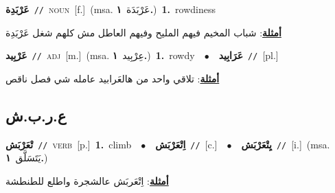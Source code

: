 \documentclass[10pt,a4paper,twoside]{article} %
\begin{document}
\begin{multicols}{2}
{\setlength\topsep{0pt}\textbf{\foreignlanguage{arabic}{عَرْبَدِة}}\ {\color{gray}\texttt{//}\color{black}}\ \textsc{noun}\ [f.]\ \color{gray}(msa. \foreignlanguage{arabic}{عَرْبَدَة}~\foreignlanguage{arabic}{\textbf{١.}})\color{black}\ \textbf{1.}~rowdiness\  \begin{flushright}\color{gray}\foreignlanguage{arabic}{\textbf{\underline{\foreignlanguage{arabic}{أمثلة}}}: شباب المخيم فيهم المليح وفيهم العاطل مش كلهم شغل عَرْبَدِة}\end{flushright}\color{black}} \vspace{2mm}

{\setlength\topsep{0pt}\textbf{\foreignlanguage{arabic}{عَرْبِيد}}\ {\color{gray}\texttt{//}\color{black}}\ \textsc{adj}\ [m.]\ \color{gray}(msa. \foreignlanguage{arabic}{عِرْبِيد}~\foreignlanguage{arabic}{\textbf{١.}})\color{black}\ \textbf{1.}~rowdy\ \ $\bullet$\ \ \setlength\topsep{0pt}\textbf{\foreignlanguage{arabic}{عَرَابِيد}}\ {\color{gray}\texttt{//}\color{black}}\ [pl.]\  \begin{flushright}\color{gray}\foreignlanguage{arabic}{\textbf{\underline{\foreignlanguage{arabic}{أمثلة}}}: تلاقي واحد من هالعَرابيد عامله شي فصل ناقص}\end{flushright}\color{black}} \vspace{2mm}

\vspace{-3mm}
\subsection*{\color{blue}\foreignlanguage{arabic}{ع.ر.ب.ش}\color{blue}{}} 

{\setlength\topsep{0pt}\textbf{\foreignlanguage{arabic}{تْعَرْبَش}}\ {\color{gray}\texttt{//}\color{black}}\ \textsc{verb}\ [p.]\ \textbf{1.}~climb\ \ $\bullet$\ \ \setlength\topsep{0pt}\textbf{\foreignlanguage{arabic}{اِتْعَرْبَش}}\ {\color{gray}\texttt{//}\color{black}}\ [c.]\ \ $\bullet$\ \ \setlength\topsep{0pt}\textbf{\foreignlanguage{arabic}{يِتْعَرْبَش}}\ {\color{gray}\texttt{//}\color{black}}\ [i.]\ \color{gray}(msa. \foreignlanguage{arabic}{يَتَسَلَّق}~\foreignlanguage{arabic}{\textbf{١.}})\color{black}\  \begin{flushright}\color{gray}\foreignlanguage{arabic}{\textbf{\underline{\foreignlanguage{arabic}{أمثلة}}}: اِتْعَربَش عالشجرة واطلع للطنطشة}\end{flushright}\color{black}} \vspace{2mm}


\end{multicols}
\end{document}
